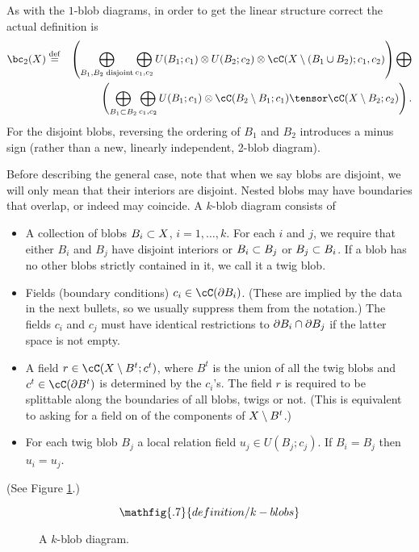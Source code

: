 As with the $1$-blob diagrams, in order to get the linear structure correct the actual definition is 
\begin{eqnarray*}
	\bc_2(X) & \deq &
	\left( 
		\bigoplus_{B_1, B_2\; \text{disjoint}} \bigoplus_{c_1, c_2}
			U(B_1; c_1) \otimes U(B_2; c_2) \otimes \lf(X\setmin (B_1\cup B_2); c_1, c_2)
	\right)  \bigoplus \\
	&& \quad\quad  \left( 
		\bigoplus_{B_1 \subset B_2} \bigoplus_{c_1, c_2}
			U(B_1; c_1) \otimes \lf(B_2 \setmin B_1; c_1) \tensor \cC(X \setminus B_2; c_2)
	\right) .
\end{eqnarray*}
For the disjoint blobs, reversing the ordering of $B_1$ and $B_2$ introduces a minus sign
(rather than a new, linearly independent, 2-blob diagram). 

Before describing the general case, note that when we say blobs are disjoint, we will only mean that their interiors are disjoint. Nested blobs may have boundaries that overlap, or indeed may coincide.
A $k$-blob diagram consists of
\begin{itemize}
\item A collection of blobs $B_i \subset X$, $i = 1, \ldots, k$.
For each $i$ and $j$, we require that either $B_i$ and $B_j$ have disjoint interiors or
$B_i \subset B_j$ or $B_j \subset B_i$.
If a blob has no other blobs strictly contained in it, we call it a twig blob.
\item Fields (boundary conditions) $c_i \in \cC(\bd B_i)$.
(These are implied by the data in the next bullets, so we usually
suppress them from the notation.)
The fields $c_i$ and $c_j$ must have identical restrictions to $\partial B_i \cap \partial B_j$
if the latter space is not empty.
\item A field $r \in \cC(X \setmin B^t; c^t)$,
where $B^t$ is the union of all the twig blobs and $c^t \in \cC(\bd B^t)$
is determined by the $c_i$'s.
The field $r$ is required to be splittable along the boundaries of all blobs, twigs or not. (This is equivalent to asking for a field on of the components of $X \setminus B^t$.)
\item For each twig blob $B_j$ a local relation field $u_j \in U(B_j; c_j)$.
If $B_i = B_j$ then $u_i = u_j$.
\end{itemize}
(See Figure \ref{blobkdiagram}.)
\begin{figure}[t]\begin{equation*}
\mathfig{.7}{definition/k-blobs}
\end{equation*}\caption{A $k$-blob diagram.}\label{blobkdiagram}\end{figure}

